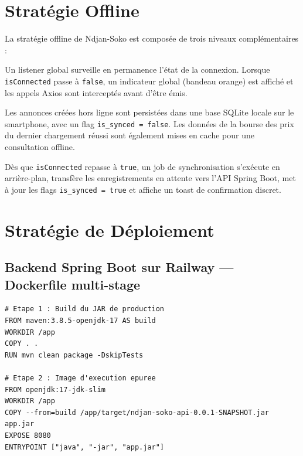 \documentclass[12pt,a4paper]{report}
\begin{document}
\section{Stratégie Offline}

La stratégie offline de Ndjan-Soko est composée de trois niveaux complémentaires :

\begin{description}[leftmargin=0pt]
  \item[\textbf{Niveau 1 — Détection réseau :}] Un listener global surveille en permanence l'état de la connexion. Lorsque \texttt{isConnected} passe à \texttt{false}, un indicateur global (bandeau orange) est affiché et les appels Axios sont interceptés avant d'être émis.

  \item[\textbf{Niveau 2 — Persistance locale :}] Les annonces créées hors ligne sont persistées dans une base SQLite locale sur le smartphone, avec un flag \texttt{is\_synced = false}. Les données de la bourse des prix du dernier chargement réussi sont également mises en cache pour une consultation offline.

  \item[\textbf{Niveau 3 — Sync Queue automatique :}] Dès que \texttt{isConnected} repasse à \texttt{true}, un job de synchronisation s'exécute en arrière-plan, transfère les enregistrements en attente vers l'API Spring Boot, met à jour les flags \texttt{is\_synced = true} et affiche un toast de confirmation discret.
\end{description}

\section{Stratégie de Déploiement}

\subsection{Backend Spring Boot sur Railway — Dockerfile multi-stage}

\begin{lstlisting}[language={}, caption={Dockerfile multi-stage pour Spring Boot}]
# Etape 1 : Build du JAR de production
FROM maven:3.8.5-openjdk-17 AS build
WORKDIR /app
COPY . .
RUN mvn clean package -DskipTests

# Etape 2 : Image d'execution epuree
FROM openjdk:17-jdk-slim
WORKDIR /app
COPY --from=build /app/target/ndjan-soko-api-0.0.1-SNAPSHOT.jar app.jar
EXPOSE 8080
ENTRYPOINT ["java", "-jar", "app.jar"]
\end{lstlisting}
\end{document}

